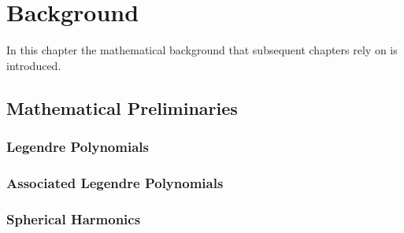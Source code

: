 \chapter{Background}\label{sec:chapter2}

In this chapter the mathematical background that subsequent chapters rely on is introduced.

\section{Mathematical Preliminaries}

\subsection{Legendre Polynomials}

\subsection{Associated Legendre Polynomials}

\subsection{Spherical Harmonics}

